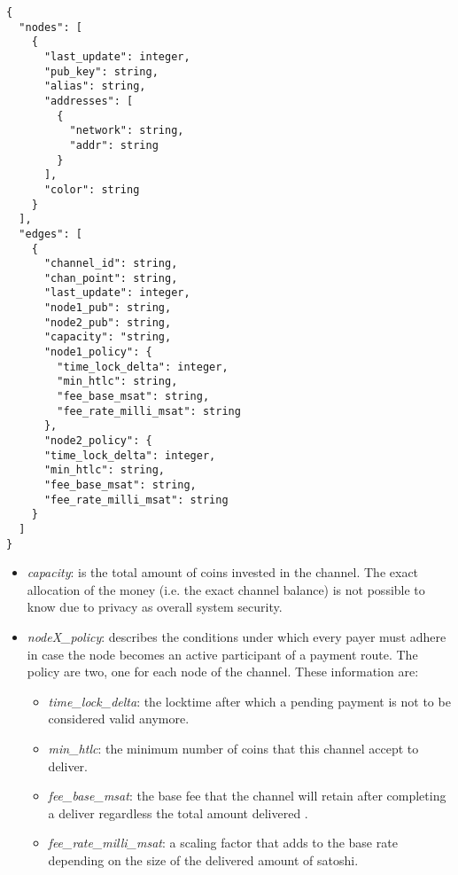 	
	\singlespacing
	\begin{lstlisting}
{
  "nodes": [
    {
      "last_update": integer,
      "pub_key": string,
      "alias": string,
      "addresses": [
        {
          "network": string,
          "addr": string
        }
      ],
      "color": string
    }
  ],
  "edges": [
    {
      "channel_id": string,
      "chan_point": string,
      "last_update": integer,
      "node1_pub": string,
      "node2_pub": string,
      "capacity": "string,
      "node1_policy": {
        "time_lock_delta": integer,
        "min_htlc": string,
        "fee_base_msat": string,
        "fee_rate_milli_msat": string
      },
      "node2_policy": {
      "time_lock_delta": integer,
      "min_htlc": string,
      "fee_base_msat": string,
      "fee_rate_milli_msat": string
    }
  ]
}
	\end{lstlisting}
	\onehalfspacing

	\begin{itemize}
		\item \textit{capacity}: is the total amount of coins invested in the channel. The exact allocation of the money (i.e. the exact channel balance) is not possible to know due to privacy as overall system security.
		
		\item \textit{nodeX\_policy}: describes the conditions under which every payer must adhere in case the node becomes an active participant of a payment route. The policy are two, one for each node of the channel. These information are:
		\begin{itemize}
			\item \textit{time\_lock\_delta}: the locktime after which a pending payment is not to be considered valid anymore.
			
			\item \textit{min\_htlc}: the minimum number of coins that this channel accept to deliver.
			
			\item \textit{fee\_base\_msat}: the base fee that the channel will retain after completing a deliver regardless the total amount delivered .
			
			\item \textit{fee\_rate\_milli\_msat}: a scaling factor that adds to the base rate depending on the size of the delivered amount of satoshi.
		\end{itemize}
	\end{itemize}
	
